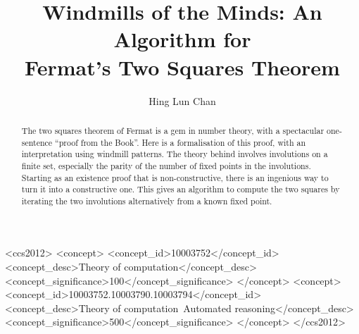 \documentclass[sigplan,screen]{acmart}
\begin{document}
\title[Windmills of the Minds: An Algorithm for Fermat's Two Squares Theorem]{Windmills of the Minds: An Algorithm for\\ Fermat's Two Squares Theorem}

\ifdefined\READY
\author{Hing Lun Chan}

\else
\fi

\date{}

\begin{abstract}
The two squares theorem of Fermat is a gem in number theory,
with a spectacular one-sentence ``proof from the Book''.
Here is a formalisation of this proof, with an interpretation using windmill patterns.
The theory behind involves involutions on a finite set, 
especially the parity of the number of fixed points in the involutions.
Starting as an existence proof that is non-constructive, there is an ingenious way to turn it into a constructive one. This gives an algorithm to compute the two squares by iterating the two involutions alternatively from a known fixed point.
\end{abstract}

\begin{CCSXML}
<ccs2012>
   <concept>
       <concept_id>10003752</concept_id>
       <concept_desc>Theory of computation</concept_desc>
       <concept_significance>100</concept_significance>
       </concept>
   <concept>
       <concept_id>10003752.10003790.10003794</concept_id>
       <concept_desc>Theory of computation~Automated reasoning</concept_desc>
       <concept_significance>500</concept_significance>
       </concept>
</ccs2012>
\end{CCSXML}



\maketitle
\end{document}
